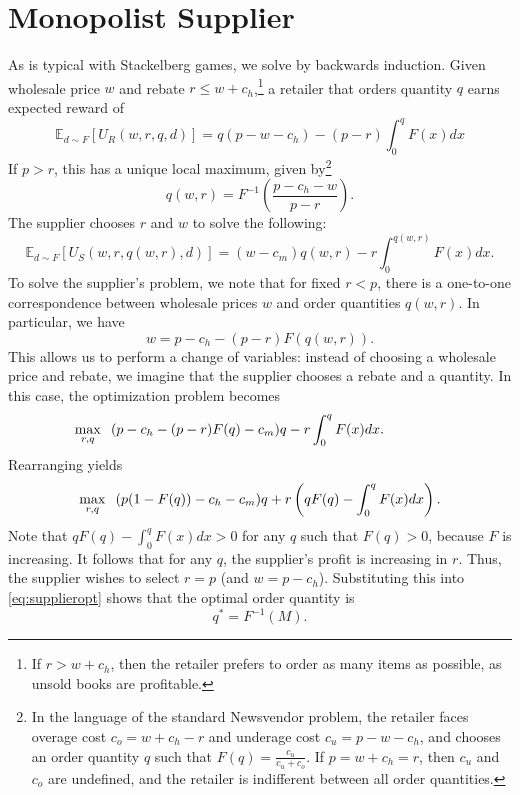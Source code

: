 \documentclass[11pt, oneside,margin=1in]{article}   	%
\newcommand{\E}{\mathbb{E}}
\begin{document}
\section{Monopolist Supplier}

As is typical with Stackelberg games, we solve by backwards induction. Given wholesale price $w$ and rebate $r \leq w + c_h$,\footnote{If $r > w + c_h$, then the retailer prefers to order as many items as possible, as unsold books are profitable.} a retailer that orders quantity $q$ earns expected reward of
\begin{equation} \E_{d \sim F} [U_R(w,r,q,d)] = q(p - w - c_h) - (p - r) \int_0^{q} F(x)dx \label{eq:ur} \end{equation}
If $p > r$, this has a unique local maximum, given by\footnote{In the language of the standard Newsvendor problem, the retailer faces overage cost $c_o = w + c_h - r$ and underage cost $c_u = p - w - c_h$, and chooses an order quantity $q$ such that $F(q) = \frac{c_u}{c_u+c_o}$. If $p = w + c_h = r$, then $c_u$ and $c_o$ are undefined, and the retailer is indifferent between all order quantities.}
\begin{equation} q(w,r) = F^{-1}\left( \frac{p - c_h - w}{p - r} \right). \label{eq:qwr} \end{equation}
The supplier chooses $r$ and $w$ to solve the following:
\[ \E_{d \sim F} [U_S(w,r,q(w,r),d)] =   (w - c_m)q(w,r) - r \int_0^{q(w,r)} F(x) dx.\]
To solve the supplier's problem, we note that for fixed $r < p$, there is a one-to-one correspondence between wholesale prices $w$ and order quantities $q(w,r)$. In particular, we have
\[w = p - c_h - (p-r)F(q(w,r)).\]
This allows us to perform a change of variables: instead of choosing a wholesale price and rebate, we imagine that the supplier chooses a rebate and a quantity. In this case, the optimization problem becomes
\begin{equation} \max_{r,q} \hspace{.1 in} ( p- c_h - (p- r)F(q)-c_m)q - r \int_0^q F(x) dx. \hspace{.6 in}\label{eq:supplieropt} \end{equation}
Rearranging yields 
\[ \max_{r,q} \hspace{.1 in} (p(1 - F(q)) - c_h - c_m)q + r\left(q F(q) -  \int_0^q F(x) dx\right).\]
Note that $q F(q) -  \int_0^q F(x) dx > 0$ for any $q$ such that $F(q) > 0$, because $F$ is increasing. It follows that for any $q$, the supplier's profit is increasing in $r$. Thus, the supplier wishes to select $r = p$ (and $w = p - c_h$). Substituting this into \eqref{eq:supplieropt} shows that the optimal order quantity is 
\begin{equation} q^* = F^{-1}(M). \label{eq:qstar} \end{equation} 
\end{document}
